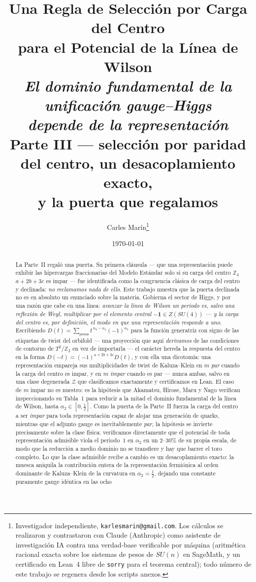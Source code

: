 \documentclass[11pt,a4paper]{article}
\title{\textbf{\Large Una Regla de Selección por Carga del Centro\\ para el Potencial de la Línea de Wilson}\\[7pt]
\large\textnormal{\itshape El dominio fundamental de la unificación gauge--Higgs\\
depende de la representación}\\[8pt]
\normalsize\textnormal{Parte III --- selección por paridad del centro, un desacoplamiento exacto,\\
y la puerta que regalamos}}
\author{Carles Mar\'in\thanks{Investigador independiente, \texttt{karlesmarin@gmail.com}.
Los cálculos se realizaron y contrastaron con Claude (Anthropic) como asistente de
investigación IA contra una verdad-base verificable por máquina (aritmética racional exacta
sobre los sistemas de pesos de $SU(n)$ en SageMath, y un certificado en Lean~4 libre de
\texttt{sorry} para el teorema central); todo número de este trabajo se regenera desde los
scripts anexos.}}
\date{\today}
\newcommand{\ZZ}{\mathbb{Z}}
\begin{document}
\maketitle

\begin{abstract}
\noindent
La Parte~II regaló una puerta. Su primera cláusula --- que una representación puede exhibir
las hipercargas fraccionarias del Modelo Estándar solo si su carga del centro $\ZZ_4$
$a+2b+3c$ es impar --- fue identificada como la congruencia clásica de carga del centro y
declinada: \emph{no reclamamos nada de ello}. Este trabajo muestra que la puerta declinada no
es en absoluto un enunciado sobre la materia. Gobierna el sector de Higgs, y por una razón que
cabe en una línea: \emph{avanzar la línea de Wilson un periodo es, salvo una reflexión de
Weyl, multiplicar por el elemento central $-\mathbf{1}\in Z(SU(4))$ --- y la carga del centro
es, por definición, el modo en que una representación responde a uno.} Escribiendo
$D(t)=\sum_{\text{pesos}} t^{\,n_2-n_4}(-1)^{n_3}$ para la función generatriz con signo de
las etiquetas de twist del orbifold --- una proyección que aquí \emph{derivamos} de las
condiciones de contorno de $T^2/\ZZ_2$ en vez de importarla --- el carácter hereda la
respuesta del centro en la forma
$D(-t)=(-1)^{a+2b+3c}D(t)$, y con ella una dicotomía: una representación empareja sus
multiplicidades de twist de Kaluza--Klein en $m$ \emph{par} cuando la carga del centro es
impar, y en $m$ \emph{impar} cuando es par --- nunca ambas, salvo en una clase degenerada
$\mathcal Z$ que clasificamos exactamente y certificamos en Lean. El caso de $m$ impar no es
nuestro: es la hipótesis que Akamatsu, Hirose, Maru y Nago verifican inspeccionando su
Tabla~1 para reducir a la mitad el dominio fundamental de la línea de Wilson, hasta
$\alpha_2\in[0,\tfrac12]$. Como la puerta de la Parte~II fuerza la carga del centro a ser
\emph{impar} para toda representación capaz de alojar una generación de quarks, mientras que
el adjunto gauge es inevitablemente \emph{par}, la hipótesis se invierte precisamente sobre
la clase física: verificamos directamente que el potencial de toda representación admisible
viola el periodo~$1$ en $\alpha_2$ en un $2$--$30\%$ de su propia escala, de modo que la
reducción a medio dominio no se transfiere y hay que barrer el toro completo. Lo que la clase
admisible recibe a cambio es un desacoplamiento exacto: la muesca aniquila la contribución
entera de la representación fermiónica al orden dominante de Kaluza--Klein de la curvatura en
$\alpha_2=\tfrac12$, dejando una constante puramente gauge idéntica en las ocho

\end{abstract}
\end{document}
